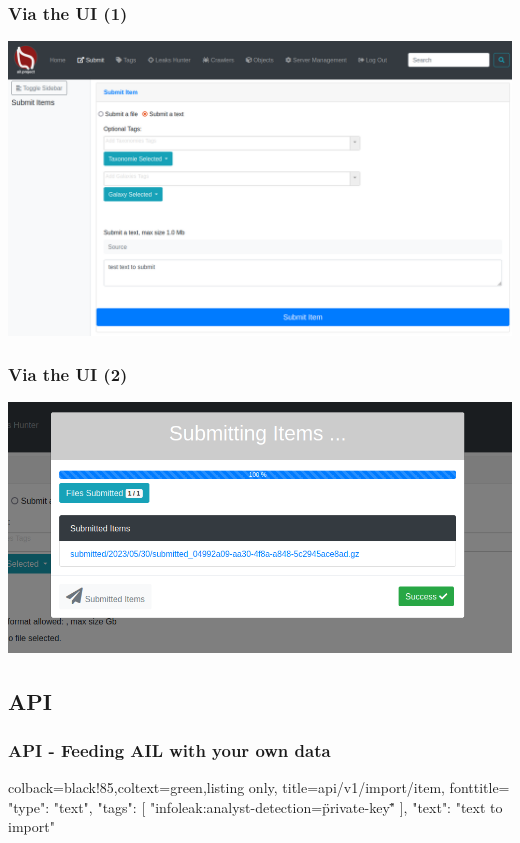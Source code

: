 \documentclass{beamer}
\begin{document}
\begin{frame}
    \frametitle{Via the UI (1)}
    \centerline{\includegraphics[scale=0.20]{screenshot/ui_submit.png}}
\end{frame}

\begin{frame}
    \frametitle{Via the UI (2)}
    \centerline{\includegraphics[scale=0.29]{screenshot/ui_submit0.png}}
\end{frame}

\subsection{API}

\begin{frame}[fragile]
    \frametitle{API - Feeding AIL with your own data}
    \begin{tcblisting}{colback=black!85,coltext=green,listing only,
        title=api/v1/import/item, fonttitle=\bfseries}
{
  "type": "text",
  "tags": [
    "infoleak:analyst-detection=\"private-key\""
  ],
  "text": "text to import"
}
\end{tcblisting}
 
\end{frame}
\end{document}
